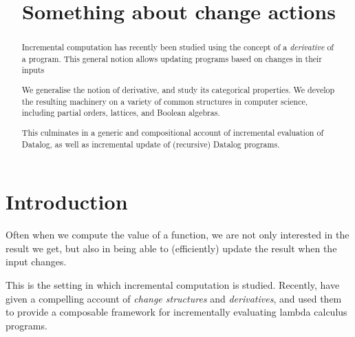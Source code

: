 
%


\usepackage{amsmath}
\usepackage{amsthm}
\usepackage{amssymb}
\usepackage{mathtools}
\usepackage{stmaryrd}
\usepackage{biblatex}
\usepackage{hyperref}
\usepackage{cleveref}







%


\begin{abstract}
  Incremental computation has recently been studied using the concept of a
  \textit{derivative} of a program. This general notion allows updating programs
  based on changes in their inputs

  We generalise the notion of derivative, and study its categorical
  properties. We develop the resulting machinery on a variety of common structures
  in computer science, including partial orders, lattices, and Boolean algebras.

  This culminates in a generic and compositional account of incremental evaluation of Datalog, as
  well as incremental update of (recursive) Datalog programs.
\end{abstract}

\title{Something about change actions}

\maketitle

\section{Introduction}

Often when we compute the value of a function, we are not only interested in the
result we get, but also in being able to (efficiently) update the result when
the input changes. 

This is the setting in which incremental computation is studied. Recently,
\textcite{cai2014changes} have given a compelling account
of \textit{change structures} and \textit{derivatives}, and used them to provide
a composable framework for incrementally evaluating lambda calculus programs.

